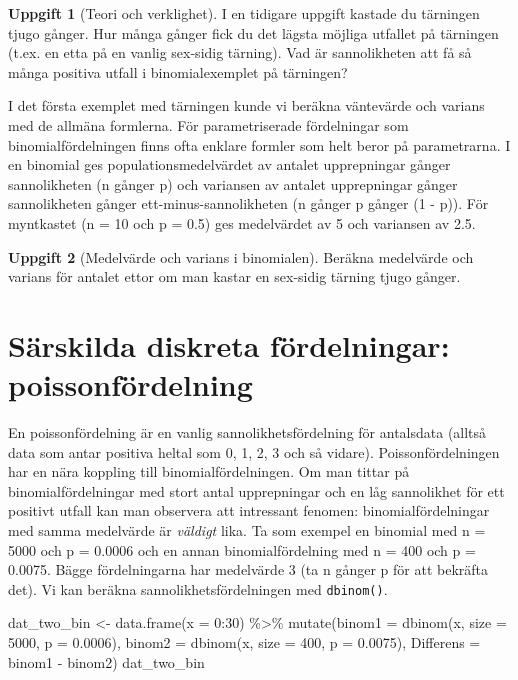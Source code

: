 \documentclass[
]{book}
\newenvironment{Shaded}{\begin{snugshade}}{\end{snugshade}}
\newcommand{\AttributeTok}[1]{\textcolor[rgb]{0.77,0.63,0.00}{#1}}
\newcommand{\DecValTok}[1]{\textcolor[rgb]{0.00,0.00,0.81}{#1}}
\newcommand{\FloatTok}[1]{\textcolor[rgb]{0.00,0.00,0.81}{#1}}
\newcommand{\FunctionTok}[1]{\textcolor[rgb]{0.00,0.00,0.00}{#1}}
\newcommand{\NormalTok}[1]{#1}
\newcommand{\OtherTok}[1]{\textcolor[rgb]{0.56,0.35,0.01}{#1}}
\newcommand{\SpecialCharTok}[1]{\textcolor[rgb]{0.00,0.00,0.00}{#1}}
\theoremstyle{definition}
\theoremstyle{definition}
\theoremstyle{definition}
\newtheorem{exercise}{Uppgift}[chapter]
\theoremstyle{definition}
\theoremstyle{remark}
\begin{document}
\begin{exercise}[Teori och verklighet]
I en tidigare uppgift kastade du tärningen tjugo gånger. Hur många gånger fick du det lägsta möjliga utfallet på tärningen (t.ex. en etta på en vanlig sex-sidig tärning). Vad är sannolikheten att få så många positiva utfall i binomialexemplet på tärningen?
\end{exercise}

I det första exemplet med tärningen kunde vi beräkna väntevärde och varians med de allmäna formlerna. För parametriserade fördelningar som binomialfördelningen finns ofta enklare formler som helt beror på parametrarna. I en binomial ges populationsmedelvärdet av antalet upprepningar gånger sannolikheten (n gånger p) och variansen av antalet upprepningar gånger sannolikheten gånger ett-minus-sannolikheten (n gånger p gånger (1 - p)). För myntkastet (n = 10 och p = 0.5) ges medelvärdet av 5 och variansen av 2.5.

\begin{exercise}[Medelvärde och varians i binomialen]
Beräkna medelvärde och varians för antalet ettor om man kastar en sex-sidig tärning tjugo gånger.
\end{exercise}

\hypertarget{suxe4rskilda-diskreta-fuxf6rdelningar-poissonfuxf6rdelning}{%
\section{Särskilda diskreta fördelningar: poissonfördelning}\label{suxe4rskilda-diskreta-fuxf6rdelningar-poissonfuxf6rdelning}}

En poissonfördelning är en vanlig sannolikhetsfördelning för antalsdata (alltså data som antar positiva heltal som 0, 1, 2, 3 och så vidare). Poissonfördelningen har en nära koppling till binomialfördelningen.
Om man tittar på binomialfördelningar med stort antal upprepningar och en låg sannolikhet för ett positivt utfall kan man observera att intressant fenomen: binomialfördelningar med samma medelvärde är \emph{väldigt} lika. Ta som exempel en binomial med n = 5000 och p = 0.0006 och en annan binomialfördelning med n = 400 och p = 0.0075. Bägge fördelningarna har medelvärde 3 (ta n gånger p för att bekräfta det). Vi kan beräkna sannolikhetsfördelningen med \texttt{dbinom()}.

\begin{Shaded}
\begin{Highlighting}[]
\NormalTok{dat\_two\_bin }\OtherTok{\textless{}{-}} \FunctionTok{data.frame}\NormalTok{(}\AttributeTok{x =} \DecValTok{0}\SpecialCharTok{:}\DecValTok{30}\NormalTok{) }\SpecialCharTok{\%\textgreater{}\%} 
  \FunctionTok{mutate}\NormalTok{(}\AttributeTok{binom1 =} \FunctionTok{dbinom}\NormalTok{(x, }\AttributeTok{size =} \DecValTok{5000}\NormalTok{, }\AttributeTok{p =} \FloatTok{0.0006}\NormalTok{),}
         \AttributeTok{binom2 =} \FunctionTok{dbinom}\NormalTok{(x, }\AttributeTok{size =} \DecValTok{400}\NormalTok{, }\AttributeTok{p =} \FloatTok{0.0075}\NormalTok{),}
         \AttributeTok{Differens =}\NormalTok{ binom1 }\SpecialCharTok{{-}}\NormalTok{ binom2)}
\NormalTok{dat\_two\_bin}
\end{Highlighting}
\end{Shaded}
\end{document}
